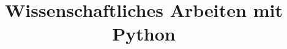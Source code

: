 

\title[Python]{Wissenschaftliches Arbeiten mit Python}



{
  \begin{frame}
    \titlepage
  \end{frame}
}





